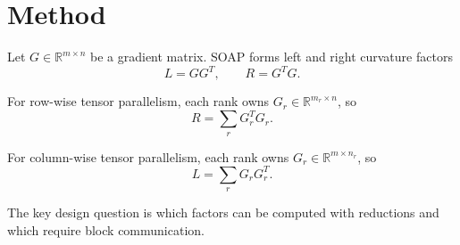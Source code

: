 \section{Method}

Let $G \in \mathbb{R}^{m \times n}$ be a gradient matrix. SOAP forms left and right curvature factors
\begin{equation}
L = GG^T, \qquad R = G^TG.
\end{equation}

For row-wise tensor parallelism, each rank owns $G_r \in \mathbb{R}^{m_r \times n}$, so
\begin{equation}
R = \sum_r G_r^T G_r.
\end{equation}

For column-wise tensor parallelism, each rank owns $G_r \in \mathbb{R}^{m \times n_r}$, so
\begin{equation}
L = \sum_r G_r G_r^T.
\end{equation}

The key design question is which factors can be computed with reductions and which require block communication.
